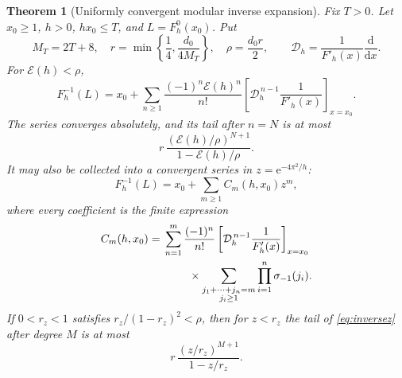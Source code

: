 \documentclass[11pt,a4paper]{article}
\newtheorem{theorem}{Theorem}[section]
\theoremstyle{definition}
\theoremstyle{remark}
\newcommand{\e}{\mathrm e}
\newcommand{\Ecal}{\mathcal E}
\newcommand{\Dcal}{\mathcal D}
\begin{document}
\begin{theorem}[Uniformly convergent modular inverse expansion]
\label{thm:inverse}
Fix $T>0$. Let $x_0\ge1$, $h>0$, $hx_0\le T$, and $L=F_h^0(x_0)$.
Put
\begin{equation}
 M_T=2T+8,\quad
 r=\min\left\{\frac14,\frac{d_0}{4M_T}\right\},\quad
 \rho=\frac{d_0r}{2},\qquad
 \Dcal_h=\frac1{F'_h(x)}\frac{\mathrm d}{\mathrm dx}.
 \label{eq:radii}
\end{equation}
For $\Ecal(h)<\rho$,
\begin{equation}
 F_h^{-1}(L)=x_0+
 \sum_{n\ge1}\frac{(-1)^n\Ecal(h)^n}{n!}
 \left[\Dcal_h^{\,n-1}\frac1{F'_h(x)}\right]_{x=x_0}.
 \label{eq:inverseE}
\end{equation}
The series converges absolutely, and its tail after $n=N$ is at most
\begin{equation}
 r\,\frac{(\Ecal(h)/\rho)^{N+1}}{1-\Ecal(h)/\rho}.
 \label{eq:inverseEtail}
\end{equation}
It may also be collected into a convergent series in $z=\e^{-4\pi^2/h}$:
\begin{equation}
 F_h^{-1}(L)=x_0+\sum_{m\ge1}C_m(h,x_0)z^m,
 \label{eq:inversez}
\end{equation}
where every coefficient is the finite expression
\begin{align}
 C_m(h,x_0)={}&\sum_{n=1}^m\frac{(-1)^n}{n!}
 \left[\Dcal_h^{\,n-1}\frac1{F'_h(x)}\right]_{x=x_0}\notag\\
 &\hspace{8mm}\times
 \sum_{\substack{j_1+\cdots+j_n=m\\j_i\ge1}}
        \prod_{i=1}^n\sigma_{-1}(j_i).
 \label{eq:Cm}
\end{align}
If $0<r_z<1$ satisfies $r_z/(1-r_z)^2<\rho$, then for $z<r_z$ the tail
of \eqref{eq:inversez} after degree $M$ is at most
\begin{equation}
 r\,\frac{(z/r_z)^{M+1}}{1-z/r_z}.
 \label{eq:inverseztail}
\end{equation}
\end{theorem}
\end{document}
